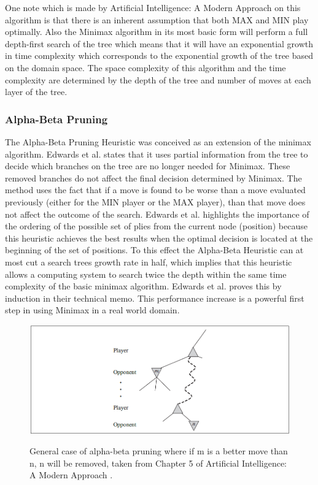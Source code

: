 \documentclass [11pt]{article}
\begin{document}
	\noindent One note which is made by Artificial Intelligence: A Modern Approach \cite{AIModern} on this algorithm is that there is an inherent assumption that both MAX and MIN play optimally. Also the Minimax algorithm in its most basic form will perform a full depth-first search of the tree which means that it will have an exponential growth in time complexity which corresponds to the exponential growth of the tree based on the domain space. The space complexity of this algorithm and the time complexity are determined by the depth of the tree and number of moves at each layer of the tree.
	
	\subsubsection{Alpha-Beta Pruning}
	The Alpha-Beta Pruning Heuristic was conceived as an extension of the minimax algorithm. Edwards et al. \cite{AIM030} states that it uses partial information from the tree to decide which branches on the tree are no longer needed for Minimax. These removed branches do not affect the final decision determined by Minimax. The method uses the fact that if a move is found to be worse than a move evaluated previously (either for the MIN player or the MAX player), than that move does not affect the outcome of the search. Edwards et al. \cite{AIM030} highlights the importance of the ordering of the possible set of plies from the current node (position) because this heuristic achieves the best results when the optimal decision is located at the beginning of the set of positions. To this effect the Alpha-Beta Heuristic can at most cut a search trees growth rate in half, which implies that this heuristic allows a computing system to search twice the depth within the same time complexity of the basic minimax algorithm. Edwards et al. \cite{AIM030} proves this by induction in their technical memo. This performance increase is a powerful first step in using Minimax in a real world domain.
	\\
	\begin{figure}[H]
		\includegraphics[width=\textwidth]{ab}\\
		\centering
		\caption{General case of alpha-beta pruning where if m is a better move than n, n will be removed, taken from Chapter 5 of Artificial Intelligence: A Modern Approach \cite{AIModern}.}
		\label{ab}
	\end{figure}
	
\end{document}
